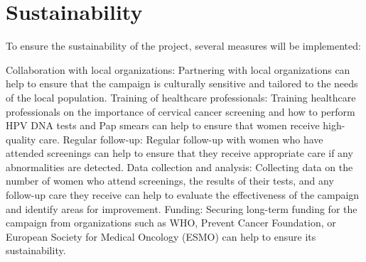\documentclass{article}
\begin{document}
\section{Sustainability} 
To ensure the sustainability of the project, several measures will be implemented: 

\begin{outline} 
\1 Collaboration with local organizations: Partnering with local organizations can help to ensure that the campaign is culturally sensitive and tailored to the needs of the local population. 
\1 Training of healthcare professionals: Training healthcare professionals on the importance of cervical cancer screening and how to perform HPV DNA tests and Pap smears can help to ensure that women receive high-quality care. 
\1 Regular follow-up: Regular follow-up with women who have attended screenings can help to ensure that they receive appropriate care if any abnormalities are detected. 
\1 Data collection and analysis: Collecting data on the number of women who attend screenings, the results of their tests, and any follow-up care they receive can help to evaluate the effectiveness of the campaign and identify areas for improvement. 
\1 Funding: Securing long-term funding for the campaign from organizations such as WHO, Prevent Cancer Foundation, or European Society for Medical Oncology (ESMO) can help to ensure its sustainability. 

\end{outline}



%
\clearpage



\end{document}
